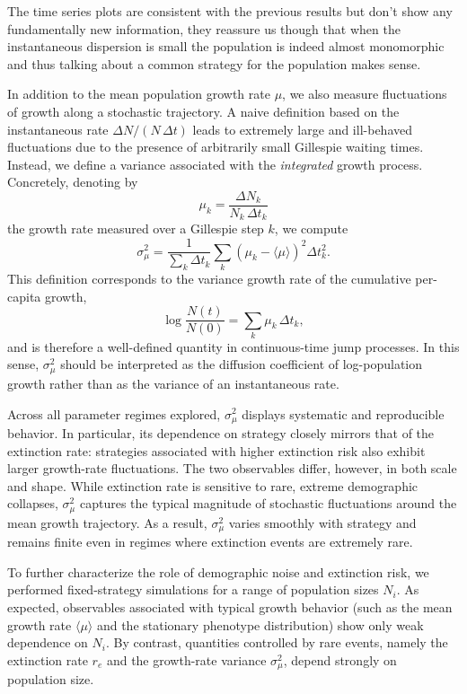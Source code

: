 \documentclass[a4paper,10pt,twocolumn]{article}
\begin{document}
The time series plots are consistent with the previous results but don't show any fundamentally new information, they reassure us though that when the instantaneous dispersion is small the population is indeed almost monomorphic and thus talking about a common strategy for the population makes sense.

In addition to the mean population growth rate $\mu$, we also measure fluctuations of growth along a stochastic trajectory. A naive definition based on the instantaneous rate $\Delta N/(N\,\Delta t)$ leads to extremely large and ill-behaved fluctuations due to the presence of arbitrarily small Gillespie waiting times. Instead, we define a variance associated with the \emph{integrated} growth process. Concretely, denoting by
\begin{equation}
    \mu_k=\frac{\Delta N_k}{N_k\,\Delta t_k}
\end{equation}
the growth rate measured over a Gillespie step $k$, we compute
\begin{equation}
    \sigma_\mu^2=\frac{1}{\sum_k \Delta t_k}\sum_k\left(\mu_k-\langle\mu\rangle\right)^2\Delta t_k^2.
\end{equation}
This definition corresponds to the variance growth rate of the cumulative per-capita growth,
\begin{equation}
    \log\frac{N(t)}{N(0)}=\sum_k \mu_k\,\Delta t_k,
\end{equation}
and is therefore a well-defined quantity in continuous-time jump processes. In this sense, $\sigma_\mu^2$ should be interpreted as the diffusion coefficient of log-population growth rather than as the variance of an instantaneous rate.

Across all parameter regimes explored, $\sigma_\mu^2$ displays systematic and reproducible behavior. In particular, its dependence on strategy closely mirrors that of the extinction rate: strategies associated with higher extinction risk also exhibit larger growth-rate fluctuations. The two observables differ, however, in both scale and shape. While extinction rate is sensitive to rare, extreme demographic collapses, $\sigma_\mu^2$ captures the typical magnitude of stochastic fluctuations around the mean growth trajectory. As a result, $\sigma_\mu^2$ varies smoothly with strategy and remains finite even in regimes where extinction events are extremely rare.

To further characterize the role of demographic noise and extinction risk, we performed fixed-strategy simulations for a range of population sizes $N_i$. As expected, observables associated with typical growth behavior (such as the mean growth rate $\langle\mu\rangle$ and the stationary phenotype distribution) show only weak dependence on $N_i$. By contrast, quantities controlled by rare events, namely the extinction rate $r_e$ and the growth-rate variance $\sigma_\mu^2$, depend strongly on population size.
\end{document}
